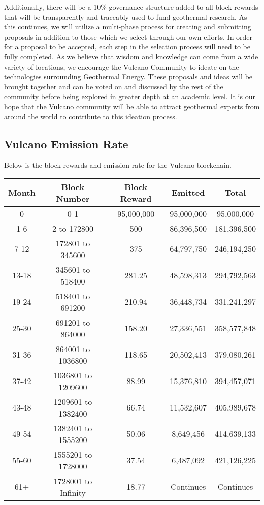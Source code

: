 \documentclass[A4paper, 12pt]{article}
\begin{document}
Additionally, there will be a 10\% governance structure added to all block rewards that will be transparently and traceably used to fund geothermal research. As this continues, we will utilize a multi-phase process for creating and submitting proposals in addition to those which we select through our own efforts. In order for a proposal to be accepted, each step in the selection process will need to be fully completed. As we believe that wisdom and knowledge can come from a wide variety of locations, we encourage the Vulcano Community to ideate on the technologies surrounding Geothermal Energy. These proposals and ideas will be brought together and can be voted on and discussed by the rest of the community before being explored in greater depth at an academic level. It is our hope that the Vulcano community will be able to attract geothermal experts from around the world to contribute to this ideation process. 

\subsection{Vulcano Emission Rate}
Below is the block rewards and emission rate for the Vulcano blockchain.
\begin{table}[h]
\centering
\begin{tabular}{@{}ccccc@{}}
\toprule
Month & Block Number & Block Reward & Emitted & Total \\ \midrule
0 & 0-1 & 95,000,000 & 95,000,000 & 95,000,000 \\
1-6 & 2 to 172800 & 500 & 86,396,500 & 181,396,500 \\
7-12 & 172801 to 345600 & 375 & 64,797,750 & 246,194,250 \\
13-18 & 345601 to 518400 & 281.25 & 48,598,313 & 294,792,563 \\
19-24 & 518401 to 691200 & 210.94 & 36,448,734 & 331,241,297 \\
25-30 & 691201 to 864000 & 158.20 & 27,336,551 & 358,577,848 \\
31-36 & 864001 to 1036800 & 118.65 & 20,502,413 & 379,080,261 \\
37-42 & 1036801 to 1209600 & 88.99 & 15,376,810 & 394,457,071 \\
43-48 & 1209601 to 1382400 & 66.74 & 11,532,607 & 405,989,678 \\
49-54 & 1382401 to 1555200 & 50.06 & 8,649,456 & 414,639,133 \\
55-60 & 1555201 to 1728000 & 37.54 & 6,487,092 & 421,126,225 \\
61+ & 1728001 to Infinity & 18.77 & Continues & Continues \\ \bottomrule
\end{tabular}
\end{table}
\end{document}
